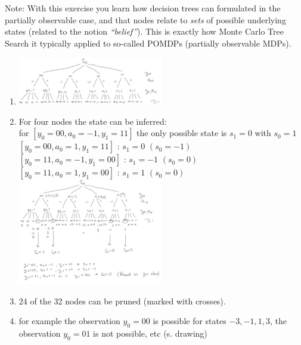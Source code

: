 Note: With this exercise you learn how decision trees can formulated in the partially observable case, and that nodes relate to \emph{sets} of possible underlying states (related to the notion \emph{``belief''}). This is exactly how Monte Carlo Tree Search it typically applied to so-called POMDPs (partially observable MDPs).


\begin{solution}
\begin{enumerate}
\item 
  \includegraphics[width=0.5\textwidth]{../pics/ex31a.png}
\item For four nodes the state can be inferred: \\
for $[y_0 = 00, a_0 = -1, y_1 = 11]$ the only possible state is $s_1 = 0$ with $s_0 = 1$ \\
$[y_0 = 00, a_0 = 1, y_1 = 11]$ : $s_1 = 0$ $(s_0 = -1)$ \\
$[y_0 = 11, a_0 = -1, y_1 = 00]$ : $s_1 = -1$ $(s_0 = 0)$ \\
$[y_0 = 11, a_0 = 1, y_1 = 00]$ : $s_1 = 1$ $(s_0 = 0)$ \\
  \includegraphics[width=0.5\textwidth]{../pics/ex31a2.png}
\item 24 of the 32 nodes can be pruned (marked with crosses).
\item for example the observation $y_0 = 00$ is possible for states $-3, -1, 1, 3$, the observation $y_0 = 01$ is not possible, etc (s. drawing)
\end{enumerate}


\end{solution}



